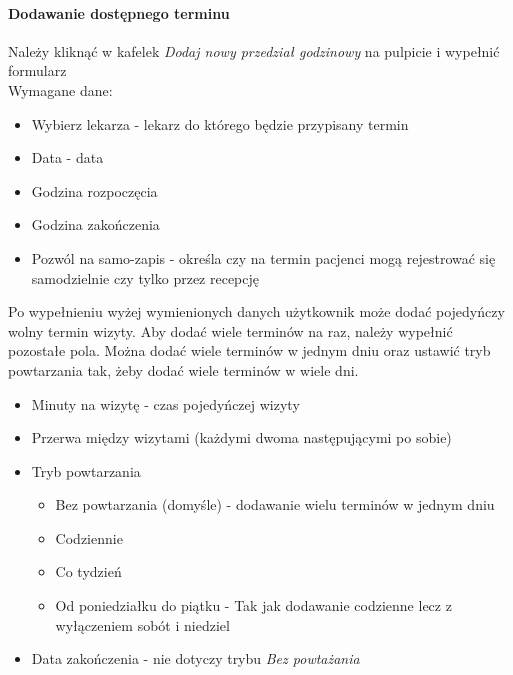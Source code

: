 \documentclass[polish,12pt]{aghthesis}
\begin{document}
    \paragraph{Dodawanie dostępnego terminu}{
        Należy kliknąć w kafelek \emph{Dodaj nowy przedział godzinowy} na pulpicie i wypełnić formularz \\
        Wymagane dane:
        \begin{itemize}
            \item Wybierz lekarza - lekarz do którego będzie przypisany termin
            \item Data - data
            \item Godzina rozpoczęcia
            \item Godzina zakończenia
            \item Pozwól na samo-zapis - określa czy na termin pacjenci mogą rejestrować się samodzielnie czy tylko przez recepcję
        \end{itemize}
        Po wypełnieniu wyżej wymienionych danych użytkownik może dodać pojedyńczy wolny termin wizyty. Aby dodać wiele terminów na raz, należy wypełnić pozostałe pola. Można dodać wiele terminów  w jednym dniu oraz ustawić tryb powtarzania tak, żeby dodać wiele terminów w wiele dni.
        \begin{itemize}
            \item Minuty na wizytę - czas pojedyńczej wizyty
            \item Przerwa między wizytami (każdymi dwoma następującymi po sobie)
            \item Tryb powtarzania \begin{itemize}
                \item Bez powtarzania (domyśle) - dodawanie wielu terminów w jednym dniu
                \item Codziennie
                \item Co tydzień
                \item Od poniedziałku do piątku - Tak jak dodawanie codzienne lecz z wyłączeniem sobót i niedziel
            \end{itemize}
            \item Data zakończenia - nie dotyczy trybu \emph{Bez powtażania}
        \end{itemize}
        \begin{figure}[H]

\end{figure}}
\end{document}
